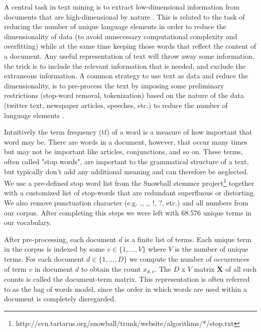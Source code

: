 \documentclass[12pt,a4paper,notitlepage]{article}
\begin{document}

A central task in text mining is to extract low-dimensional information from documents that are high-dimensional by nature \citep{bholat_text_2015}. This is related to the task of reducing the number of unique language elements in order to reduce the dimensionality of data (to avoid unnecessary computational complexity and overfitting) while at the same time keeping those words that reflect the content of a document. Any useful representation of text will throw away some information, the trick is to include the relevant information that is needed, and exclude the extraneous information. A common strategy to use text as data and reduce the dimensionality, is to pre-process the text by imposing some preliminary restrictions (stop-word removal, tokenization) based on the nature of the data (twitter text, newspaper articles, speeches, etc.) to reduce the number of language elements \citep{gentzkow_text_2017}. 

Intuitively the term frequency (tf) of a word is a measure of how important that word may be. There are words in a document, however, that occur many times but may not be important like articles, conjunctions, and so on. These terms, often called "stop words", are important to the grammatical structure of a text, but typically don't add any additional meaning and can therefore be neglected. We use a pre-defined stop word list from the Snowball stemmer project\footnote{http://svn.tartarus.org/snowball/trunk/website/algorithms/*/stop.txt} together with a customized list of stop-words that are redundant superfluous or distorting. We also remove punctuation character (e.g. ., ,, !, ?, etc.) and all numbers from our corpus. After completing this steps we were left with 68.576 unique terms in our vocabulary.

After pre-processing, each document $d$ is a finite list of terms. Each unique term in the corpus is indexed by some $v \in \lbrace 1,...,V \rbrace$ where $V$ is the number of unique terms. For each document $d \in \lbrace 1,...,D \rbrace$ we compute the number of occurrences of term $v$ in document $d$ to obtain the count $x_{d,v}$. The $D$ x $V$ matrix $\boldsymbol{X}$ of all such counts is called the document-term matrix. This representation is often referred to as the bag of words model, since the order in which words are used within a document is completely disregarded. 
\end{document}
